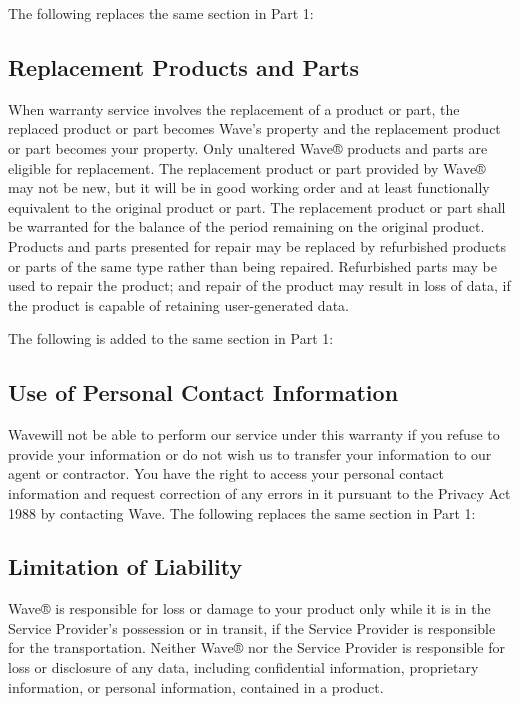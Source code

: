 \documentclass[letterpaper,10pt,openany,oneside,english]{sphinxmanual}
\begin{document}
The following replaces the same section in Part 1:


\subsection{Replacement Products and Parts}
\label{\detokenize{part2:replacement-products-and-parts}}
When warranty service involves the replacement of a product or part, the replaced product or part becomes Wave’s property and the replacement product or part becomes your property. Only unaltered Wave® products and parts are eligible for replacement. The replacement product or part provided by Wave® may not be new, but it will be in good working order and at least functionally equivalent to the original product or part. The replacement product or part shall be warranted for the balance of the period remaining on the original product. Products and parts presented for repair may be replaced by refurbished products or parts of the same type rather than being repaired. Refurbished parts may be used to repair the product; and repair of the product may result in loss of data, if the product is capable of retaining user-generated data.

The following is added to the same section in Part 1:


\subsection{Use of Personal Contact Information}
\label{\detokenize{part2:use-of-personal-contact-information}}
Wavewill not be able to perform our service under this warranty if you refuse to provide your information or do not wish us to transfer your information to our agent or contractor. You have the right to access your personal contact information and request correction of any errors in it pursuant to the Privacy Act 1988 by contacting Wave. The following replaces the same section in Part 1:


\subsection{Limitation of Liability}
\label{\detokenize{part2:limitation-of-liability}}
Wave® is responsible for loss or damage to your product only while it is in the Service Provider’s possession or in transit, if the Service Provider is responsible for the transportation. Neither Wave® nor the Service Provider is responsible for loss or disclosure of any data, including confidential information, proprietary information, or personal information, contained in a product.
\end{document}
